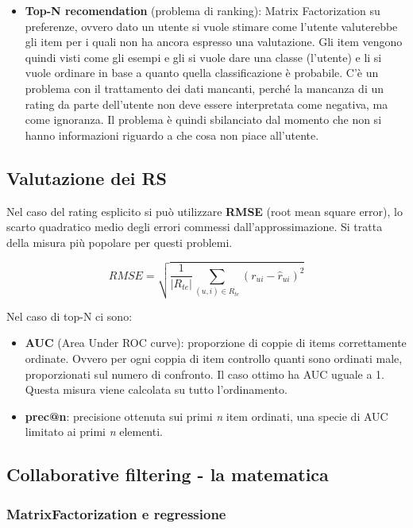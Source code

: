 \begin{itemize}
\item
  \textbf{Top-N recomendation} (problema di ranking): Matrix
  Factorization su preferenze, ovvero dato un utente si vuole stimare
  come l'utente valuterebbe gli item per i quali non ha ancora espresso una valutazione. Gli item vengono quindi visti come gli esempi e gli si vuole
  dare una classe (l'utente) e li si vuole ordinare in base a quanto
  quella classificazione è probabile. C'è un problema con il trattamento
  dei dati mancanti, perché la mancanza di un rating da parte
  dell'utente non deve essere interpretata come negativa, ma come
  ignoranza. Il problema è quindi sbilanciato dal momento che non si
  hanno informazioni riguardo a che cosa non piace all'utente.
\end{itemize}

\subsection{Valutazione dei RS}\label{valutazione-dei-rs}

Nel caso del rating esplicito si può utilizzare \textbf{RMSE} (root mean
square error), lo scarto quadratico medio degli errori commessi
dall'approssimazione. Si tratta della misura più popolare per questi
problemi.

$$
RMSE = \sqrt{\frac{1}{|R_{te}|} \sum_{(u,i) \in R_{te}} (r_{ui} - \hat{r}_{ui})^2}
$$

Nel caso di top-N ci sono:

\begin{itemize}
\tightlist
\item
  \textbf{AUC} (Area Under ROC curve): proporzione di coppie di items
  correttamente ordinate. Ovvero per ogni coppia di item controllo
  quanti sono ordinati male, proporzionati sul numero di confronto. Il
  caso ottimo ha AUC uguale a 1. Questa misura viene calcolata su tutto
  l'ordinamento.
\item
  \textbf{prec@n}: precisione ottenuta sui primi \emph{n} item ordinati,
  una specie di AUC limitato ai primi \emph{n} elementi.
\end{itemize}

\subsection{Collaborative filtering - la matematica}\label{collaborative-filtering-la-matematica}

\subsubsection{MatrixFactorization e
regressione}\label{matrixfactorization-e-regressione}

